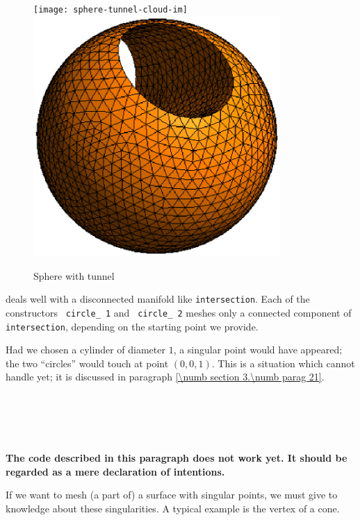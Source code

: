 \begin{figure}[ht] \centering
\if{}
 \texttt{[image: sphere-tunnel-cloud-im]}
\else
 \includegraphics[width=94mm]{sphere-tunnel-low-res}
\fi
  \caption{Sphere with tunnel}
  \label{\numb section 3.\numb fig 7}
\end{figure}

{\ManiFEM} deals well with a disconnected manifold like {\small\tt intersection}.
Each of the constructors {\small\tt {} circle\_\,1} and {\small\tt {} circle\_\,2} meshes only
a connected component of {\small\tt intersection}, depending on the starting point we provide.

Had we chosen a cylinder of diameter $1$, a singular point would have appeared;
the two ``circles'' would touch at point $ (0,0,1) $.
This is a situation which {\maniFEM} cannot handle yet; it is discussed in paragraph
\ref{\numb section 3.\numb parag 21}.


\section{~~}\label{\numb section 3.\numb parag 20}

{\normalfont\bfseries The code described in this paragraph does not work yet.
It should be regarded as a mere declaration of intentions.}
\medskip

If we want to mesh (a part of) a surface with singular points, we must give to {\maniFEM}
knowledge about these singularities.
A typical example is the vertex of a cone.

